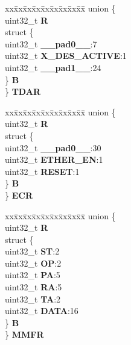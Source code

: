 \begin{DoxyCompactItemize}
\begin{tabbing}
\end{tabbing}\item 
\mbox{\label{structFEC__tag_a34afa0dc27c8eb30a4488003e177e055}} 
\begin{tabbing}
xx\=xx\=xx\=xx\=xx\=xx\=xx\=xx\=xx\=\kill
union \{\\
\>uint32\_t {\bfseries R}\\
\>struct \{\\
\>\>uint32\_t {\bfseries \_\_pad0\_\_}:7\\
\>\>uint32\_t {\bfseries X\_DES\_ACTIVE}:1\\
\>\>uint32\_t {\bfseries \_\_pad1\_\_}:24\\
\>\} {\bfseries B}\\
\} {\bfseries TDAR}\\

\end{tabbing}\item 
\mbox{\label{structFEC__tag_a53aad2c54eaa356e221847cf52a2b76a}} 
\begin{tabbing}
xx\=xx\=xx\=xx\=xx\=xx\=xx\=xx\=xx\=\kill
union \{\\
\>uint32\_t {\bfseries R}\\
\>struct \{\\
\>\>uint32\_t {\bfseries \_\_pad0\_\_}:30\\
\>\>uint32\_t {\bfseries ETHER\_EN}:1\\
\>\>uint32\_t {\bfseries RESET}:1\\
\>\} {\bfseries B}\\
\} {\bfseries ECR}\\

\end{tabbing}\item 
\mbox{\label{structFEC__tag_a8bc3d76e8aadb411f91c711a8ce0b542}} 
\begin{tabbing}
xx\=xx\=xx\=xx\=xx\=xx\=xx\=xx\=xx\=\kill
union \{\\
\>uint32\_t {\bfseries R}\\
\>struct \{\\
\>\>uint32\_t {\bfseries ST}:2\\
\>\>uint32\_t {\bfseries OP}:2\\
\>\>uint32\_t {\bfseries PA}:5\\
\>\>uint32\_t {\bfseries RA}:5\\
\>\>uint32\_t {\bfseries TA}:2\\
\>\>uint32\_t {\bfseries DATA}:16\\
\>\} {\bfseries B}\\
\} {\bfseries MMFR}\\


\end{tabbing}
\end{DoxyCompactItemize}

